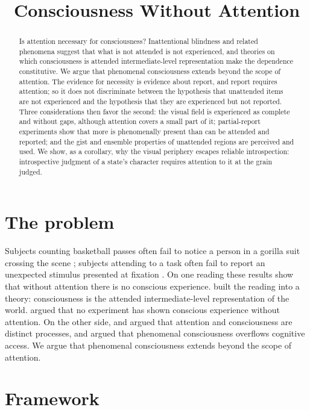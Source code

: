 \documentclass{situationist-preprint}
\title{Consciousness Without Attention}
\begin{document}
\maketitle

\begin{abstract}
Is attention necessary for consciousness? Inattentional blindness and related phenomena suggest that what is not attended is not experienced, and theories on which consciousness is attended intermediate-level representation make the dependence constitutive. We argue that phenomenal consciousness extends beyond the scope of attention. The evidence for necessity is evidence about report, and report requires attention; so it does not discriminate between the hypothesis that unattended items are not experienced and the hypothesis that they are experienced but not reported. Three considerations then favor the second: the visual field is experienced as complete and without gaps, although attention covers a small part of it; partial-report experiments show that more is phenomenally present than can be attended and reported; and the gist and ensemble properties of unattended regions are perceived and used. We show, as a corollary, why the visual periphery escapes reliable introspection: introspective judgment of a state's character requires attention to it at the grain judged.
\end{abstract}

\section{The problem}

Subjects counting basketball passes often fail to notice a person in a gorilla suit crossing the scene \citep{SimonsChabris1999}; subjects attending to a task often fail to report an unexpected stimulus presented at fixation \citep{MackRock1998}. On one reading these results show that without attention there is no conscious experience. \citet{Prinz2012} built the reading into a theory: consciousness is the attended intermediate-level representation of the world. \citet{Cohen2012} argued that no experiment has shown conscious experience without attention. On the other side, \citet{Lamme2003} and \citet{KochTsuchiya2007} argued that attention and consciousness are distinct processes, and \citet{Block2007} argued that phenomenal consciousness overflows cognitive access. We argue that phenomenal consciousness extends beyond the scope of attention.

\section{Framework}
\end{document}
